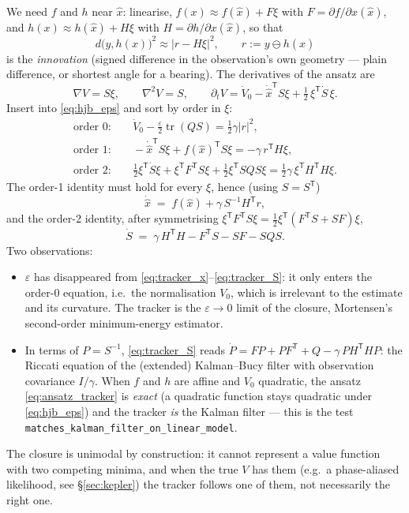 \documentclass[11pt,a4paper]{article}
\newcommand{\tr}{\operatorname{tr}}
\newcommand{\T}{^{\mathsf T}}
\newcommand{\xh}{\hat{x}}
\newcommand{\eps}{\varepsilon}
\newcommand{\abs}[1]{\left\lvert #1 \right\rvert}
\newcommand{\grad}{\nabla}
\theoremstyle{plain}
\theoremstyle{definition}
\theoremstyle{remark}
\begin{document}
We need $f$ and $h$ near $\xh$: linearise, $f(x)\approx f(\xh)+F\xi$ with $F=\partial f/\partial x(\xh)$, and $h(x)\approx h(\xh)+H\xi$ with $H=\partial h/\partial x(\xh)$, so that
\[
  d\big(y,h(x)\big)^2 \approx \abs{r - H\xi}^2, \qquad r := y \ominus h(\xh)
\]
is the \emph{innovation} (signed difference in the observation's own geometry --- plain difference, or shortest angle for a bearing). The derivatives of the ansatz are
\[
  \grad V = S\xi,\qquad \grad^2 V = S,\qquad
  \partial_t V = \dot V_0 - \dot{\xh}\T S\xi + \tfrac12\,\xi\T\dot S\,\xi .
\]
Insert into \eqref{eq:hjb_eps} and sort by order in $\xi$:
\begin{align*}
  \text{order }0:&\quad \dot V_0 - \tfrac{\eps}{2}\tr(QS) = \tfrac12\gamma\abs{r}^2,\\
  \text{order }1:&\quad -\dot{\xh}\T S\xi + f(\xh)\T S\xi = -\gamma\, r\T H\xi ,\\
  \text{order }2:&\quad \tfrac12\xi\T\dot S\xi + \xi\T F\T S\xi + \tfrac12\xi\T S Q S\xi = \tfrac12\gamma\,\xi\T H\T H\xi .
\end{align*}
The order-1 identity must hold for every $\xi$, hence (using $S=S\T$)
\begin{equation}
  \dot{\xh} \;=\; f(\xh) + \gamma\, S^{-1}H\T r ,
  \label{eq:tracker_x}
\end{equation}
and the order-2 identity, after symmetrising $\xi\T F\T S\xi = \tfrac12\xi\T(F\T S+SF)\xi$,
\begin{equation}
  \dot S \;=\; \gamma\,H\T H - F\T S - S F - S Q S .
  \label{eq:tracker_S}
\end{equation}
Two observations:
\begin{itemize}[nosep]
  \item $\eps$ has disappeared from \eqref{eq:tracker_x}--\eqref{eq:tracker_S}: it only enters the order-0 equation, i.e.\ the normalisation $V_0$, which is irrelevant to the estimate and its curvature. The tracker is the $\eps\to0$ limit of the closure, Mortensen's second-order minimum-energy estimator.
  \item In terms of $P=S^{-1}$, \eqref{eq:tracker_S} reads $\dot P = FP + PF\T + Q - \gamma\,PH\T HP$: the Riccati equation of the (extended) Kalman--Bucy filter with observation covariance $I/\gamma$. When $f$ and $h$ are affine and $V_0$ quadratic, the ansatz \eqref{eq:ansatz_tracker} is \emph{exact} (a quadratic function stays quadratic under \eqref{eq:hjb_eps}) and the tracker \emph{is} the Kalman filter --- this is the test \texttt{matches\_kalman\_filter\_on\_linear\_model}.
\end{itemize}
The closure is unimodal by construction: it cannot represent a value function with two competing minima, and when the true $V$ has them (e.g.\ a phase-aliased likelihood, see \S\ref{sec:kepler}) the tracker follows one of them, not necessarily the right one.
\end{document}

